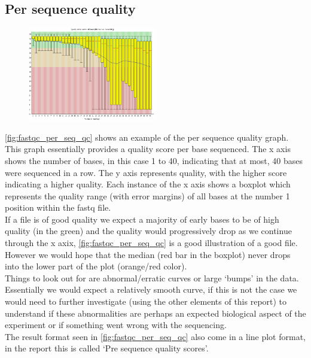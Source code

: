 \subsection{Per sequence quality \label{subsec:fastqc_seq_quality}}
\begin{figure}
  \begin{center}
    \includegraphics[width=0.5\textwidth]{figures/FastQC_per_base_sequence_quality.png}
  \end{center}
  \label{fig:fastqc_per_seq_qc}
\end{figure}
\autoref{fig:fastqc_per_seq_qc} shows an example of the per sequence quality graph. This graph essentially provides a quality score per base sequenced. The x axis shows the number of bases, in this case 1 to 40, indicating that at most, 40 bases were sequenced in a row. The y axis represents quality, with the higher score indicating a higher quality. Each instance of the x axis shows a boxplot which represents the quality range (with error margins) of all bases at the number 1 position within the fastq file.\\
If a file is of good quality we expect a majority of early bases to be of high quality (in the green) and the quality would progressively drop as we continue through the x axix, \autoref{fig:fastqc_per_seq_qc} is a good illustration of a good file. However we would hope that the median (red bar in the boxplot) never drops into the lower part of the plot (orange/red color).\\
Things to look out for are abnormal/erratic curves or large `bumps' in the data. Essentially we would expect a relatively smooth curve, if this is not the case we would need to further investigate (using the other elements of this report) to understand if these abnormalities are perhaps an expected biological aspect of the experiment or if something went wrong with the sequencing.\\
The result format seen in \autoref{fig:fastqc_per_seq_qc} also come in a line plot format, in the report this is called `Pre sequence quality scores'.

